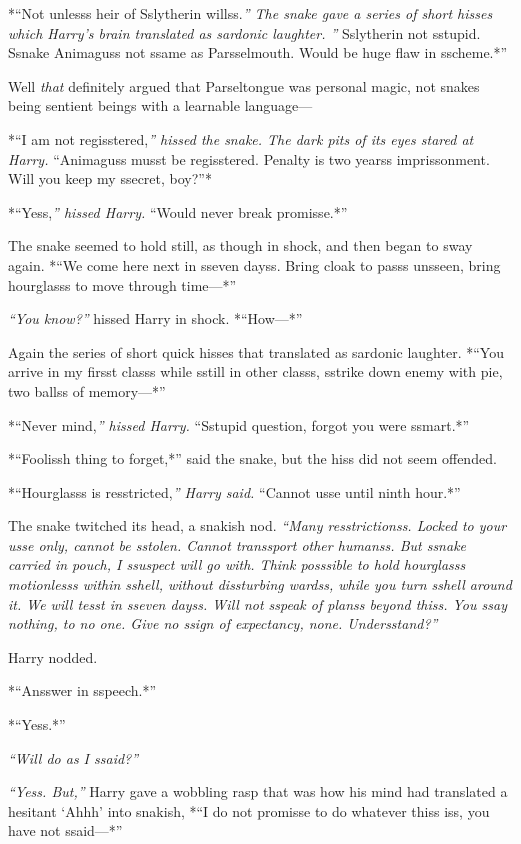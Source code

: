 *``Not unlesss heir of Sslytherin willss.\emph{'' The snake gave a
series of short hisses which Harry's brain translated as sardonic
laughter. '' }Sslytherin not sstupid. Ssnake Animaguss not ssame as
Parsselmouth. Would be huge flaw in sscheme.*''

Well \emph{that} definitely argued that Parseltongue was personal magic,
not snakes being sentient beings with a learnable language---

*``I am not regisstered,\emph{'' hissed the snake. The dark pits of its
eyes stared at Harry. }``Animaguss musst be regisstered. Penalty is two
yearss imprissonment. Will you keep my ssecret, boy?''*

*``Yess,\emph{'' hissed Harry. }``Would never break promisse.*''

The snake seemed to hold still, as though in shock, and then began to
sway again. *``We come here next in sseven dayss. Bring cloak to passs
unsseen, bring hourglasss to move through time---*''

\emph{``You know?''} hissed Harry in shock. *``How---*''

Again the series of short quick hisses that translated as sardonic
laughter. *``You arrive in my firsst classs while sstill in other
classs, sstrike down enemy with pie, two ballss of memory---*''

*``Never mind,\emph{'' hissed Harry. }``Sstupid question, forgot you
were ssmart.*''

*``Foolissh thing to forget,*'' said the snake, but the hiss did not
seem offended.

*``Hourglasss is resstricted,\emph{'' Harry said. }``Cannot usse until
ninth hour.*''

The snake twitched its head, a snakish nod. \emph{``Many resstrictionss.
Locked to your usse only, cannot be sstolen. Cannot transsport other
humanss. But ssnake carried in pouch, I ssuspect will go with. Think
posssible to hold hourglasss motionlesss within sshell, without
dissturbing wardss, while you turn sshell around it. We will tesst in
sseven dayss. Will not sspeak of planss beyond thiss. You ssay nothing,
to no one. Give no ssign of expectancy, none. Undersstand?''}

Harry nodded.

*``Ansswer in sspeech.*''

*``Yess.*''

\emph{``Will do as I ssaid?''}

\emph{``Yess. But,''} Harry gave a wobbling rasp that was how his mind
had translated a hesitant `Ahhh' into snakish, *``I do not promisse to
do whatever thiss iss, you have not ssaid---*''

